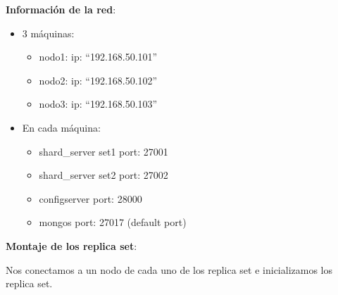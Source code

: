 \documentclass[a4paper,10pt,english]{sphinxmanual}
\begin{document}
\textbf{Información de la red}:
\begin{itemize}
\item {} 
3 máquinas:
\begin{itemize}
\item {} 
nodo1:              ip: ``192.168.50.101''

\item {} 
nodo2:              ip: ``192.168.50.102''

\item {} 
nodo3:              ip: ``192.168.50.103''

\end{itemize}

\item {} 
En cada máquina:
\begin{itemize}
\item {} 
shard\_server set1   port: 27001

\item {} 
shard\_server set2   port: 27002

\item {} 
configserver        port: 28000

\item {} 
mongos              port: 27017 (default port)

\end{itemize}

\end{itemize}

\textbf{Montaje de los replica set}:

Nos conectamos a un nodo de cada uno de los replica set e inicializamos los replica set.
\end{document}
